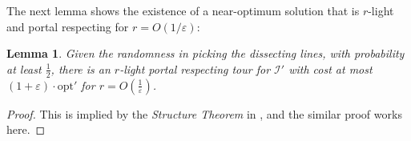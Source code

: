 \documentclass[pdflatex,sn-mathphys-num]{sn-jnl}
\theoremstyle{thmstyleone}
\newtheorem{lemma}{Lemma}
\newcommand{\eps}{\varepsilon}
\newcommand{\opt}{{\text{opt}}}
\newcommand{\OPT}{{\text{OPT}}}
\begin{document}
The next lemma shows the existence of a near-optimum solution that is 
$r$-light and portal respecting for $r=O(1/\eps)$:
\begin{lemma}\label{lemma:p-tour-r-light}
    Given the randomness in picking the dissecting lines, with probability at least $\frac 12$, there is an $r$-light portal respecting tour for $\mathcal I'$ with cost at most $(1+\eps)\cdot \opt'$ for 
    $r = O(\frac{1}\eps)$.
\end{lemma}
\begin{proof}
    This is implied by the {\em Structure Theorem} in \cite{Arora98}, and the similar proof works here.
    

\end{proof}
\end{document}

